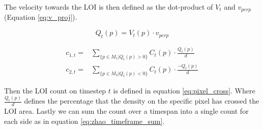 The velocity towards the LOI is then defined as the dot-product of $V_t$ and $v_{perp}$ (Equation \ref{eq:v_proj}).

\begin{equation}
	Q_t(p) = V_t(p) \cdot v_{perp}
	\label{eq:v_proj}
\end{equation}


\begin{equation}
\begin{aligned}
	c_{1,t} =& \sum_{\{p \in M_1 | Q_t(p) > 0\}} C_t(p) \cdot \frac{Q_t(p)}{d}\\
	c_{2,t} =& \sum_{\{p \in M_2 | Q_t(p) < 0\}} C_t(p) \cdot \frac{-Q_t(p)}{d}
\end{aligned}
\label{eq:pixel_cross}
\end{equation}

Then the LOI count on timestep $t$ is defined in equation \ref{eq:pixel_cross}. Where $\frac{Q_t(p)}{d}$ defines the percentage that the density on the specific pixel has crossed the LOI area. Lastly we can sum the count over a timespan into a single count for each side as in equation \ref{eq:zhao_timeframe_sum}.

